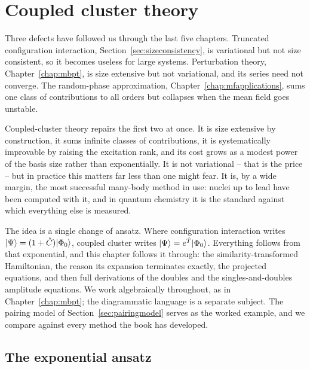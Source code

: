 \chapter{Coupled cluster theory}
\label{chap:cctheory}

Three defects have followed us through the last five chapters.  Truncated
configuration interaction, Section~\ref{sec:sizeconsistency}, is variational
but not size consistent, so it becomes useless for large systems.
Perturbation theory, Chapter~\ref{chap:mbpt}, is size extensive but not
variational, and its series need not converge.  The random-phase
approximation, Chapter~\ref{chap:mfapplications}, sums one class of
contributions to all orders but collapses when the mean field goes unstable.

Coupled-cluster theory repairs the first two at once.  It is size extensive
by construction, it sums infinite classes of contributions, it is
systematically improvable by raising the excitation rank, and its cost grows
as a modest power of the basis size rather than exponentially.  It is not
variational -- that is the price -- but in practice this matters far less than
one might fear.  It is, by a wide margin, the most successful many-body method
in use: nuclei up to lead have been computed with it, and in quantum chemistry
it is the standard against which everything else is measured.

The idea is a single change of ansatz.  Where configuration interaction writes
$\vert \Psi \rangle=(1+\hat{C})\vert \Phi_0 \rangle$, coupled cluster writes
$\vert \Psi \rangle=e^{\hat{T}}\vert \Phi_0 \rangle$.  Everything follows from that
exponential, and this chapter follows it through: the similarity-transformed
Hamiltonian, the reason its expansion terminates exactly, the projected
equations, and then full derivations of the doubles and the singles-and-doubles
amplitude equations.  We work algebraically throughout, as in
Chapter~\ref{chap:mbpt}; the diagrammatic language is a separate subject.  The
pairing model of Section~\ref{sec:pairingmodel} serves as the worked example,
and we compare against every method the book has developed.

\section{The exponential ansatz}
\label{sec:exponentialansatz}

